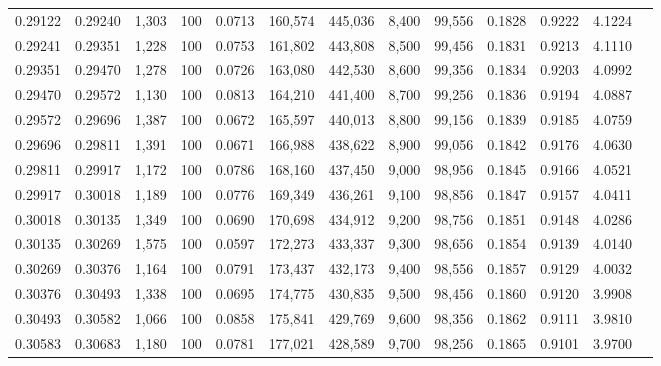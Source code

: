 \begin{tabular}{rrrrrrrrrrrrr}
0.29122 & 0.29240 & 1,303 & 100 &                                     0.0713 & 160,574 & 445,036 &   8,400 &  99,556 & 0.1828 & 0.9222 & 4.1224 \\
0.29241 & 0.29351 & 1,228 & 100 &                                     0.0753 & 161,802 & 443,808 &   8,500 &  99,456 & 0.1831 & 0.9213 & 4.1110 \\
0.29351 & 0.29470 & 1,278 & 100 &                                     0.0726 & 163,080 & 442,530 &   8,600 &  99,356 & 0.1834 & 0.9203 & 4.0992 \\
0.29470 & 0.29572 & 1,130 & 100 &                                     0.0813 & 164,210 & 441,400 &   8,700 &  99,256 & 0.1836 & 0.9194 & 4.0887 \\
0.29572 & 0.29696 & 1,387 & 100 &                                     0.0672 & 165,597 & 440,013 &   8,800 &  99,156 & 0.1839 & 0.9185 & 4.0759 \\
0.29696 & 0.29811 & 1,391 & 100 &                                     0.0671 & 166,988 & 438,622 &   8,900 &  99,056 & 0.1842 & 0.9176 & 4.0630 \\
0.29811 & 0.29917 & 1,172 & 100 &                                     0.0786 & 168,160 & 437,450 &   9,000 &  98,956 & 0.1845 & 0.9166 & 4.0521 \\
0.29917 & 0.30018 & 1,189 & 100 &                                     0.0776 & 169,349 & 436,261 &   9,100 &  98,856 & 0.1847 & 0.9157 & 4.0411 \\
0.30018 & 0.30135 & 1,349 & 100 &                                     0.0690 & 170,698 & 434,912 &   9,200 &  98,756 & 0.1851 & 0.9148 & 4.0286 \\
0.30135 & 0.30269 & 1,575 & 100 &                                     0.0597 & 172,273 & 433,337 &   9,300 &  98,656 & 0.1854 & 0.9139 & 4.0140 \\
0.30269 & 0.30376 & 1,164 & 100 &                                     0.0791 & 173,437 & 432,173 &   9,400 &  98,556 & 0.1857 & 0.9129 & 4.0032 \\
0.30376 & 0.30493 & 1,338 & 100 &                                     0.0695 & 174,775 & 430,835 &   9,500 &  98,456 & 0.1860 & 0.9120 & 3.9908 \\
0.30493 & 0.30582 & 1,066 & 100 &                                     0.0858 & 175,841 & 429,769 &   9,600 &  98,356 & 0.1862 & 0.9111 & 3.9810 \\
0.30583 & 0.30683 & 1,180 & 100 &                                     0.0781 & 177,021 & 428,589 &   9,700 &  98,256 & 0.1865 & 0.9101 & 3.9700 \\

\end{tabular}
